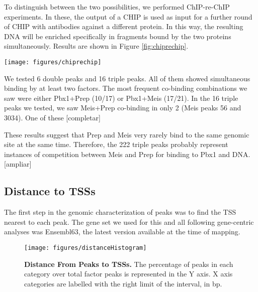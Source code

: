 To distinguish between the two possibilities, we performed ChIP-re-ChIP experiments. In these, the output of a \ac{CHIP} is used as input for a further round of \ac{CHIP} with antibodies against a different protein. In this way, the resulting DNA will be enriched specifically in fragments bound by the two proteins simultaneously. Results are shown in Figure \ref{fig:chiprechip}.

\begin{SCfigure}[]
  
  \centering
  \texttt{[image: figures/chiprechip]}
  \caption[ChIP-re-ChIP experiments]{\textbf{ChIP-re-ChIP experiments.} Factors were subjected to succesive round of \ac{CHIP} with antibodies with different specificities, as indicated. Unspecific antibody (IgG) was used as a negative control. Purified DNA was amplified in a rate-limiting \ac{PCR} to obtain an amount of product roughly proportional to the peak DNA present. Band intensities over IgG band were considered as positive signals.}
  \label{fig:chiprechip}
\end{SCfigure}

We tested 6 double peaks and 16 triple peaks. All of them showed simultaneous binding by at least two factors. The most frequent co-binding combinations we saw were either Pbx1+Prep (10/17) or Pbx1+Meis (17/21). In the 16 triple peaks we tested, we saw Meis+Prep co-binding in only 2 (Meis peaks 56 and 3034). One of these [completar]

These results suggest that Prep and Meis very rarely bind to the same genomic site at the same time. Therefore, the 222 triple peaks probably represent instances of competition between Meis and Prep for binding to Pbx1 and DNA. [ampliar]


\subsection{Distance to TSSs}

The first step in the genomic characterization of peaks was to find the \ac{TSS} nearest to each peak. The gene set we used for this and all following gene-centric analyses was Ensembl63, the latest version available at the time of mapping.

\begin{figure}[]
  
  \centering
  \texttt{[image: figures/distanceHistogram]}
  \caption[Distance From Peaks to \ac{TSS}s]{\textbf{Distance From Peaks to \ac{TSS}s.} The percentage of peaks in each category over total factor peaks is represented in the Y axis. X axis categories are labelled with the right limit of the interval, in \ac{bp}.}
  \label{fig:distanceHistogram}
\end{figure}

